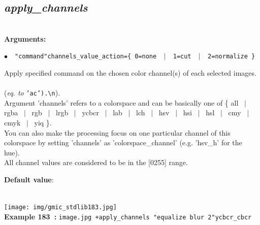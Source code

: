 \documentclass[a4paper,10.5pt,twoside]{book}
\def\comma{\discretionary{,}{}{,}}
\newcommand{\Cb}[1]{\textcolor{cb}{#1}}
\newcommand{\Cc}[1]{\textcolor{cc}{#1}}
\begin{document}
\subsection{\emph{apply\_channels} }\vspace*{-0.7em}
~\\\textbf{\Cb{Arguments: }}\begin{flushleft}
{\small \Cb{\hspace*{0.5cm}$\bullet$~~\texttt{"command"{\comma}channels{\comma}\_value\_action=\{ 0=none ~$|$~ 1=cut ~$|$~ 2=normal\-ize \}}}}\end{flushleft}
Apply specified command on the chosen color channel(s) of each selected images.
~\\(\emph{eq. to} {\small \texttt{'ac').\textbackslash n}}).
~\\Argument 'channels' refers to a colorspace{\comma} and can be basically one of \{ all ~$|$~ rgba ~$|$~ rgb ~$|$~ lrgb ~$|$~ ycbcr ~$|$~ lab ~$|$~ lch ~$|$~ hsv ~$|$~ hsi ~$|$~ hsl ~$|$~ cmy ~$|$~ cmyk ~$|$~ yiq \}.
~\\You can also make the processing focus on one particular channel of this colorspace{\comma} by setting 'channels' as 'colorspace\_channel' (e.g. 'hsv\_h' for the hue).
~\\All channel values are considered to be in the [0{\comma}255] range.
\begin{flushleft}\Cc{\textbf{Default value}:\\~\\\hspace*{0.5cm}{\small $\bullet$~~\texttt{'value\_action=0'.}}}\end{flushleft}
\begin{center}\texttt{[image: img/gmic\_stdlib183.jpg]}\\
{\footnotesize \textbf{Example 183~:} \texttt{image.jpg +apply\_channels "equalize blur 2"{\comma}ycbcr\_cbcr}}
\end{center}
\end{document}

